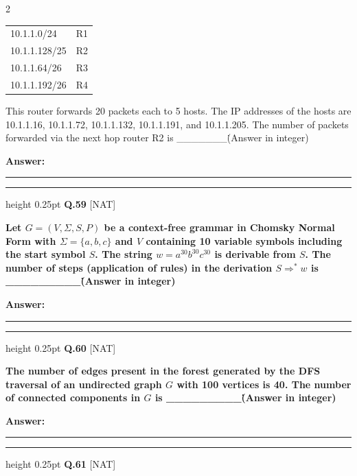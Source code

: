\documentclass[a4paper,10pt,twoside]{article}
\begin{document}
\begin{multicols}{2}
{\begin{center}
\begin{tabular}{|l|c|}
\hline
10.1.1.0/24 & R1 \\
10.1.1.128/25 & R2 \\
10.1.1.64/26 & R3 \\
10.1.1.192/26 & R4 \\
\hline
\end{tabular}
\end{center}
This router forwards 20 packets each to 5 hosts. The IP addresses of the hosts are 10.1.1.16, 10.1.1.72, 10.1.1.132, 10.1.1.191, and 10.1.1.205. The number of packets forwarded via the next hop router R2 is \_\_\_\_\_\_\_\. (Answer in integer) \par}
\par\vspace{3pt}\noindent\textbf{Answer:} \rule{3.2cm}{0.4pt}
\par\vspace{6pt}\hrule height 0.25pt\vspace{6pt}
\noindent\textbf{Q.59} \hfill {\footnotesize\textsf{[NAT]}}
\par\vspace{2pt}
{\bfseries Let $G = (V, \Sigma, S, P)$ be a context-free grammar in Chomsky Normal Form with $\Sigma = \{a, b, c\}$ and $V$ containing 10 variable symbols including the start symbol $S$. The string $w = a^{30}b^{30}c^{30}$ is derivable from $S$. The number of steps (application of rules) in the derivation $S \Rightarrow^* w$ is \_\_\_\_\_\_\_\_\_\. (Answer in integer) \par}
\par\vspace{3pt}\noindent\textbf{Answer:} \rule{3.2cm}{0.4pt}
\par\vspace{6pt}\hrule height 0.25pt\vspace{6pt}
\noindent\textbf{Q.60} \hfill {\footnotesize\textsf{[NAT]}}
\par\vspace{2pt}
{\bfseries The number of edges present in the forest generated by the DFS traversal of an undirected graph $G$ with 100 vertices is 40. The number of connected components in $G$ is \_\_\_\_\_\_\_\_\_\. (Answer in integer) \par}
\par\vspace{3pt}\noindent\textbf{Answer:} \rule{3.2cm}{0.4pt}
\par\vspace{6pt}\hrule height 0.25pt\vspace{6pt}
\noindent\textbf{Q.61} \hfill {\footnotesize\textsf{[NAT]}}

\end{multicols}
\end{document}
